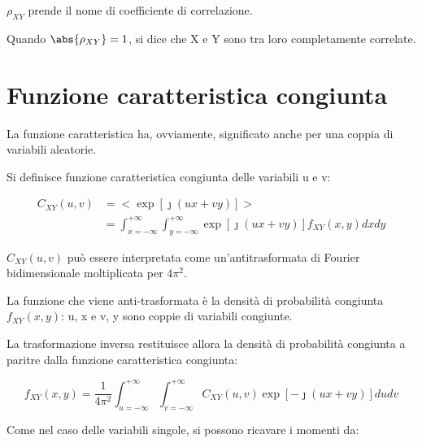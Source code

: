 $\rho_{XY}$ prende il nome di coefficiente di correlazione. \newline


Quando $\abs{\rho_{XY}} = 1$, si dice che X e Y sono tra loro completamente correlate. \newline 

\newpage 

\section{Funzione caratteristica congiunta}

La funzione caratteristica ha, ovviamente, significato anche per una coppia di variabili aleatorie. \newline 

Si definisce funzione caratteristica congiunta delle variabili u e v: 

{
    \Large
    \begin{equation}
        \begin{split}
            C_{XY} (u, v)
            &= 
            <\exp[\jmath (ux + vy)]>
            \\ 
            &= 
            \int_{x = -\infty}^{+ \infty}
            \int_{y = -\infty}^{+ \infty}
            \exp[\jmath (ux + vy)]
            f_{XY} (x, y) 
            dx dy
        \end{split}
    \end{equation}
}

$C_{XY} (u, v)$ può essere interpretata come un'antitrasformata di Fourier bidimensionale moltiplicata per $4 \pi ^{2}$. \newline 

La funzione che viene anti-trasformata è la densità di probabilità congiunta $f_{XY} (x, y)$: 
u, x e v, y sono coppie di variabili congiunte. \newline 


La trasformazione inversa restituisce allora la densità di probabilità congiunta a paritre dalla funzione caratteristica congiunta: 

{
    \Large 
    \begin{equation}
        f_{XY} (x, y)
        = 
        \frac{1}{4 \pi^{2}}
        \int_{u = -\infty}^{+ \infty}
        \int_{v = -\infty}^{+ \infty}
        C_{XY} (u, v)
        \exp[-\jmath (ux + vy)]
        du dv
    \end{equation}
}

Come nel caso delle variabili singole, si possono ricavare i momenti da: 

